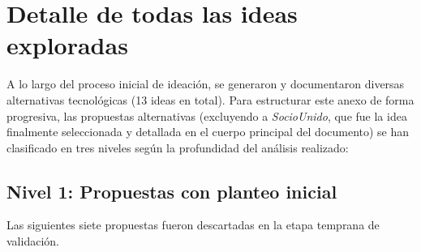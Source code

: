 \section{Detalle de todas las ideas exploradas}

A lo largo del proceso inicial de ideación, se generaron y documentaron diversas alternativas tecnológicas (13 ideas en total). Para estructurar este anexo de forma progresiva, las propuestas alternativas (excluyendo a \textit{SocioUnido}, que fue la idea finalmente seleccionada y detallada en el cuerpo principal del documento) se han clasificado en tres niveles según la profundidad del análisis realizado:

\subsection{Nivel 1: Propuestas con planteo inicial}

Las siguientes siete propuestas fueron descartadas en la etapa temprana de validación.

